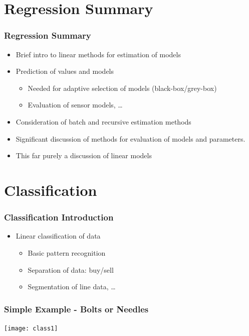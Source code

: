 \documentclass[10pt]{beamer}
\begin{document}
\section{Regression Summary}

\begin{frame}
  \frametitle{Regression Summary}
  \begin{itemize}
  \item Brief intro to linear methods for estimation of models
  \item Prediction of values and models
    \begin{itemize}
    \item Needed for adaptive selection of models (black-box/grey-box)
    \item Evaluation of sensor models, \ldots
    \end{itemize}
  \item Consideration of batch and recursive estimation methods
  \item Significant discussion of methods for evaluation of models and
    parameters.
  \item This far purely a discussion of linear models
  \end{itemize}
\end{frame}


\section{Classification}

\begin{frame}
  \frametitle{Classification Introduction}
  \begin{itemize}
  \item Linear classification of data
    \begin{itemize}
    \item Basic pattern recognition
    \item Separation of data: buy/sell
    \item Segmentation of line data, \ldots
    \end{itemize}
  \end{itemize}
\end{frame}

\begin{frame}
  \frametitle{Simple Example - Bolts or Needles}
  \begin{center}
    \texttt{[image: class1]}
  \end{center}
\end{frame}
\end{document}
